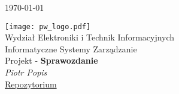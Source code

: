 \begin{titlepage}
	\hfill {\small \today}\\[1cm]
	\begin{center}
		\vspace{-4cm}
		\texttt{[image: pw\_logo.pdf]}\\[0.5cm]
		{\Large Wydział Elektroniki i Technik Informacyjnych}\\[0.5cm]
		{\large Informatyczne Systemy Zarządzanie}\\[2cm]
		{\normalsize Projekt - \textbf{Sprawozdanie}}\\[1.5cm]
		{\Large\itshape Piotr Popis}\\[3cm]
		\hspace*{\fill}
		\small\href{https://github.com/sqoshi/it-management-systemss}{Repozytorium}
	\end{center}
\end{titlepage}